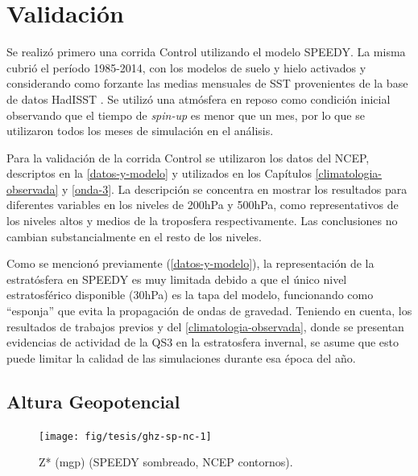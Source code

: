 \documentclass[spanish,a4paper,12pt,oneside]{book}
\begin{document}
\section{Validación}\label{validacion}

Se realizó primero una corrida Control utilizando el modelo SPEEDY. La
misma cubrió el período 1985-2014, con los modelos de suelo y hielo
activados y considerando como forzante las medias mensuales de SST
provenientes de la base de datos HadISST \citep{Rayner2003}. Se utilizó
una atmósfera en reposo como condición inicial observando que el tiempo
de \emph{spin-up} es menor que un mes, por lo que se utilizaron todos
los meses de simulación en el análisis.

Para la validación de la corrida Control se utilizaron los datos del
NCEP, descriptos en la \autoref{datos-y-modelo} y utilizados en los
Capítulos \ref{climatologia-observada} y \ref{onda-3}. La descripción se
concentra en mostrar los resultados para diferentes variables en los
niveles de 200hPa y 500hPa, como representativos de los niveles altos y
medios de la troposfera respectivamente. Las conclusiones no cambian
substancialmente en el resto de los niveles.

Como se mencionó previamente (\autoref{datos-y-modelo}), la
representación de la estratósfera en SPEEDY es muy limitada debido a que
el único nivel estratosférico disponible (30hPa) es la tapa del modelo,
funcionando como ``esponja'' que evita la propagación de ondas de
gravedad. Teniendo en cuenta, los resultados de trabajos previos y del
\autoref{climatologia-observada}, donde se presentan evidencias de
actividad de la QS3 en la estratosfera invernal, se asume que esto puede
limitar la calidad de las simulaciones durante esa época del año.

\subsection{Altura Geopotencial}\label{altura-geopotencial-1}

\begin{landscape}\begin{figure}

{\centering \texttt{[image: fig/tesis/ghz-sp-nc-1]} 

}

\caption{Z* (mgp) (SPEEDY sombreado, NCEP contornos).}\label{fig:ghz-sp-nc}
\end{figure}
\end{landscape}
\end{document}
